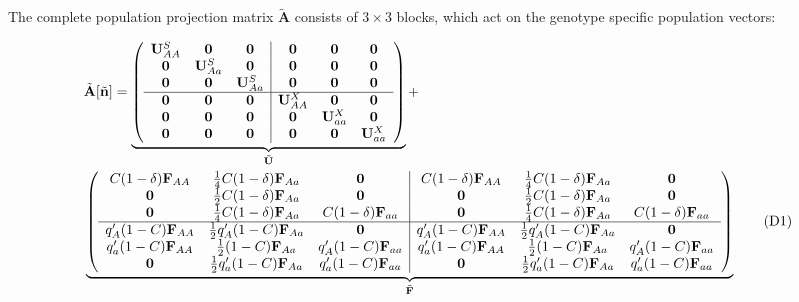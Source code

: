\documentclass[11pt]{article}
\newcommand\numberthis{\addtocounter{equation}{1}\tag{\theequation}}
\def\mbf#1{\mathbf{#1}}
\begin{document}
The complete population projection matrix $\tilde{\mbf{A}}$ consists of $3 \times 3$ blocks, which act on the genotype specific population vectors:

{
\small

\begin{align*} \label{eq:AtildeFull}
	&\tilde{\mbf{A}}[\tilde{\mbf{n}}] = 
		 \underbrace{\left(
			\begin{array}{ccc|ccc}
				\mbf{U}^S_{AA} & \mbf{0} & \mbf{0} & \mbf{0} & \mbf{0} & \mbf{0} \\ 
				\mbf{0} & \mbf{U}^S_{Aa} & \mbf{0} & \mbf{0} & \mbf{0} & \mbf{0} \\
				\mbf{0} & \mbf{0} & \mbf{U}^S_{Aa} & \mbf{0} & \mbf{0} & \mbf{0} \\ \hline
				\mbf{0} & \mbf{0} & \mbf{0} & \mbf{U}^X_{AA} & \mbf{0} & \mbf{0} \\
				\mbf{0} & \mbf{0} & \mbf{0} & \mbf{0} & \mbf{U}^X_{aa} & \mbf{0}\\
				\mbf{0} & \mbf{0} & \mbf{0} & \mbf{0} & \mbf{0} & \mbf{U}^X_{aa}
			\end{array} \right)}_{\tilde{\mbf{U}}} + \\ 
	&\underbrace{\left(
			\begin{array}{ccc|ccc}
				C (1 - \delta) \mbf{F}_{AA} & \frac{1}{4} C (1 - \delta) \mbf{F}_{Aa} & \mbf{0} & C (1 - \delta) \mbf{F}_{AA} & \frac{1}{4} C (1 - \delta) \mbf{F}_{Aa} & \mbf{0} \\ 
				\mbf{0} & \frac{1}{2} C (1 - \delta) \mbf{F}_{Aa} & \mbf{0} & \mbf{0} & \frac{1}{2} C (1 - \delta) \mbf{F}_{Aa} & \mbf{0}  \\
				\mbf{0} & \frac{1}{4} C (1 - \delta) \mbf{F}_{Aa} & C (1 - \delta) \mbf{F}_{aa} & \mbf{0} & \frac{1}{4} C (1 - \delta) \mbf{F}_{Aa} & C (1 - \delta) \mbf{F}_{aa} \\ \hline
				q^{\prime}_{A} (1 - C)\mbf{F}_{AA} & \frac{1}{2} q^{\prime}_{A} (1 - C)\mbf{F}_{Aa}  & \mbf{0} & q^{\prime}_{A} (1 - C) \mbf{F}_{AA}& \frac{1}{2} q^{\prime}_{A} (1 - C) \mbf{F}_{Aa} & \mbf{0} \\
				q^{\prime}_{a} (1 - C) \mbf{F}_{AA} & \frac{1}{2} (1 - C)\mbf{F}_{Aa}  & q^{\prime}_{A} (1 - C)\mbf{F}_{aa}  & q^{\prime}_{a} (1 - C) \mbf{F}_{AA} & \frac{1}{2}(1 - C) \mbf{F}_{Aa}  & q^{\prime}_{A} (1 - C)\mbf{F}_{aa}  \\
				\mbf{0} & \frac{1}{2} q^{\prime}_{a} (1 - C)\mbf{F}_{Aa} & q^{\prime}_{a} (1 - C) \mbf{F}_{aa} & \mbf{0} & \frac{1}{2} q^{\prime}_{a} (1 - C)\mbf{F}_{Aa} & q^{\prime}_{a} (1 - C)\mbf{F}_{aa} 
			\end{array} \right)}_{\tilde{\mbf{F}}} \numberthis
\end{align*}

}
\end{document}
